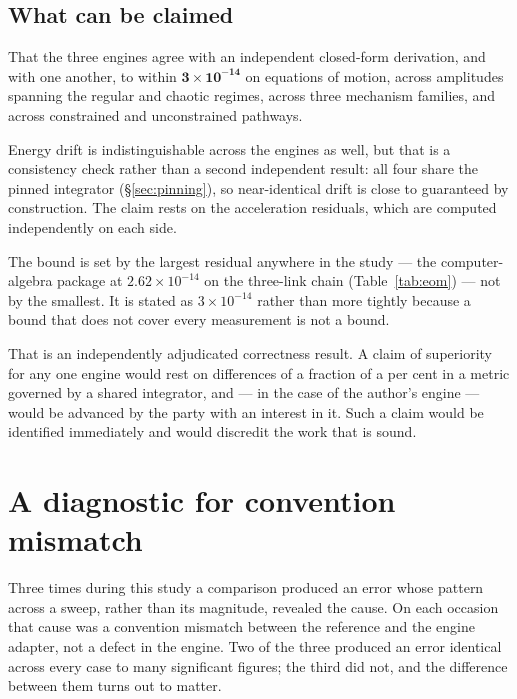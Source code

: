 \documentclass[review,12pt]{elsarticle}
\begin{document}
\subsection{What can be claimed}
That the three engines agree with an independent closed-form derivation, and
with one another, to within $\mathbf{3\times10^{-14}}$ on equations of motion,
across amplitudes spanning the regular and chaotic regimes, across three
mechanism families, and across constrained and unconstrained pathways.

Energy drift is indistinguishable across the engines as well, but that is a
consistency check rather than a second independent result: all four share the
pinned integrator (\S\ref{sec:pinning}), so near-identical drift is close to
guaranteed by construction. The claim rests on the acceleration residuals,
which are computed independently on each side.

The bound is set by the largest residual anywhere in the study --- the
computer-algebra package at $2.62\times10^{-14}$ on the three-link chain
(Table~\ref{tab:eom}) --- not by the smallest. It is stated as
$3\times10^{-14}$ rather than more tightly because a bound that does not cover
every measurement is not a bound.

That is an independently adjudicated correctness result. A claim of superiority
for any one engine would rest on differences of a fraction of a per cent in a
metric governed by a shared integrator, and --- in the case of the author's
engine --- would be advanced by the party with an interest in it. Such a claim
would be identified immediately and would discredit the work that is sound.

\section{A diagnostic for convention mismatch}\label{sec:diagnostic}

Three times during this study a comparison produced an error whose pattern across
a sweep, rather than its magnitude, revealed the cause. On each occasion that
cause was a convention mismatch between the reference and the engine adapter,
not a defect in the engine. Two of the three produced an error identical across
every case to many significant figures; the third did not, and the difference
between them turns out to matter.
\end{document}
